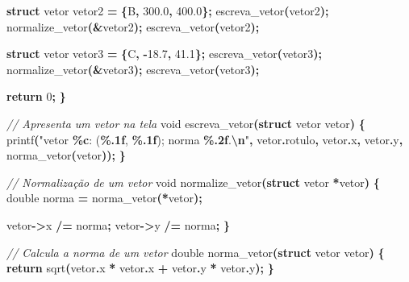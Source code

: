 \documentclass[
  11pt,
  a4paper,
]{scrbook}
\newenvironment{Shaded}{\begin{snugshade}}{\end{snugshade}}
\newcommand{\CharTok}[1]{\textcolor[rgb]{0.31,0.60,0.02}{#1}}
\newcommand{\CommentTok}[1]{\textcolor[rgb]{0.56,0.35,0.01}{\textit{#1}}}
\newcommand{\ControlFlowTok}[1]{\textcolor[rgb]{0.13,0.29,0.53}{\textbf{#1}}}
\newcommand{\DataTypeTok}[1]{\textcolor[rgb]{0.13,0.29,0.53}{#1}}
\newcommand{\DecValTok}[1]{\textcolor[rgb]{0.00,0.00,0.81}{#1}}
\newcommand{\FloatTok}[1]{\textcolor[rgb]{0.00,0.00,0.81}{#1}}
\newcommand{\KeywordTok}[1]{\textcolor[rgb]{0.13,0.29,0.53}{\textbf{#1}}}
\newcommand{\NormalTok}[1]{#1}
\newcommand{\OperatorTok}[1]{\textcolor[rgb]{0.81,0.36,0.00}{\textbf{#1}}}
\newcommand{\SpecialCharTok}[1]{\textcolor[rgb]{0.81,0.36,0.00}{\textbf{#1}}}
\newcommand{\StringTok}[1]{\textcolor[rgb]{0.31,0.60,0.02}{#1}}
\begin{document}
\begin{Shaded}
\begin{Highlighting}[]
    \KeywordTok{struct}\NormalTok{ vetor vetor2 }\OperatorTok{=} \OperatorTok{\{}\CharTok{\textquotesingle{}B\textquotesingle{}}\OperatorTok{,} \FloatTok{300.0}\OperatorTok{,} \FloatTok{400.0}\OperatorTok{\};}
\NormalTok{    escreva\_vetor}\OperatorTok{(}\NormalTok{vetor2}\OperatorTok{);}
\NormalTok{    normalize\_vetor}\OperatorTok{(\&}\NormalTok{vetor2}\OperatorTok{);}
\NormalTok{    escreva\_vetor}\OperatorTok{(}\NormalTok{vetor2}\OperatorTok{);}

    \KeywordTok{struct}\NormalTok{ vetor vetor3 }\OperatorTok{=} \OperatorTok{\{}\CharTok{\textquotesingle{}C\textquotesingle{}}\OperatorTok{,} \OperatorTok{{-}}\FloatTok{18.7}\OperatorTok{,} \FloatTok{41.1}\OperatorTok{\};}
\NormalTok{    escreva\_vetor}\OperatorTok{(}\NormalTok{vetor3}\OperatorTok{);}
\NormalTok{    normalize\_vetor}\OperatorTok{(\&}\NormalTok{vetor3}\OperatorTok{);}
\NormalTok{    escreva\_vetor}\OperatorTok{(}\NormalTok{vetor3}\OperatorTok{);}

    \ControlFlowTok{return} \DecValTok{0}\OperatorTok{;}
\OperatorTok{\}}

\CommentTok{// Apresenta um vetor na tela}
\DataTypeTok{void}\NormalTok{ escreva\_vetor}\OperatorTok{(}\KeywordTok{struct}\NormalTok{ vetor vetor}\OperatorTok{)} \OperatorTok{\{}
\NormalTok{    printf}\OperatorTok{(}\StringTok{"vetor }\SpecialCharTok{\%c}\StringTok{: (}\SpecialCharTok{\%.1f}\StringTok{, }\SpecialCharTok{\%.1f}\StringTok{); norma }\SpecialCharTok{\%.2f}\StringTok{.}\SpecialCharTok{\textbackslash{}n}\StringTok{"}\OperatorTok{,}\NormalTok{ vetor}\OperatorTok{.}\NormalTok{rotulo}\OperatorTok{,}\NormalTok{ vetor}\OperatorTok{.}\NormalTok{x}\OperatorTok{,}
\NormalTok{            vetor}\OperatorTok{.}\NormalTok{y}\OperatorTok{,}\NormalTok{ norma\_vetor}\OperatorTok{(}\NormalTok{vetor}\OperatorTok{));}
\OperatorTok{\}}

\CommentTok{// Normalização de um vetor}
\DataTypeTok{void}\NormalTok{ normalize\_vetor}\OperatorTok{(}\KeywordTok{struct}\NormalTok{ vetor }\OperatorTok{*}\NormalTok{vetor}\OperatorTok{)} \OperatorTok{\{}
    \DataTypeTok{double}\NormalTok{ norma }\OperatorTok{=}\NormalTok{ norma\_vetor}\OperatorTok{(*}\NormalTok{vetor}\OperatorTok{);}

\NormalTok{    vetor}\OperatorTok{{-}\textgreater{}}\NormalTok{x }\OperatorTok{/=}\NormalTok{ norma}\OperatorTok{;}
\NormalTok{    vetor}\OperatorTok{{-}\textgreater{}}\NormalTok{y }\OperatorTok{/=}\NormalTok{ norma}\OperatorTok{;}
\OperatorTok{\}}

\CommentTok{// Calcula a norma de um vetor}
\DataTypeTok{double}\NormalTok{ norma\_vetor}\OperatorTok{(}\KeywordTok{struct}\NormalTok{ vetor vetor}\OperatorTok{)} \OperatorTok{\{}
    \ControlFlowTok{return}\NormalTok{ sqrt}\OperatorTok{(}\NormalTok{vetor}\OperatorTok{.}\NormalTok{x }\OperatorTok{*}\NormalTok{ vetor}\OperatorTok{.}\NormalTok{x }\OperatorTok{+}\NormalTok{ vetor}\OperatorTok{.}\NormalTok{y }\OperatorTok{*}\NormalTok{ vetor}\OperatorTok{.}\NormalTok{y}\OperatorTok{);}
\OperatorTok{\}}
\end{Highlighting}
\end{Shaded}
\end{document}
